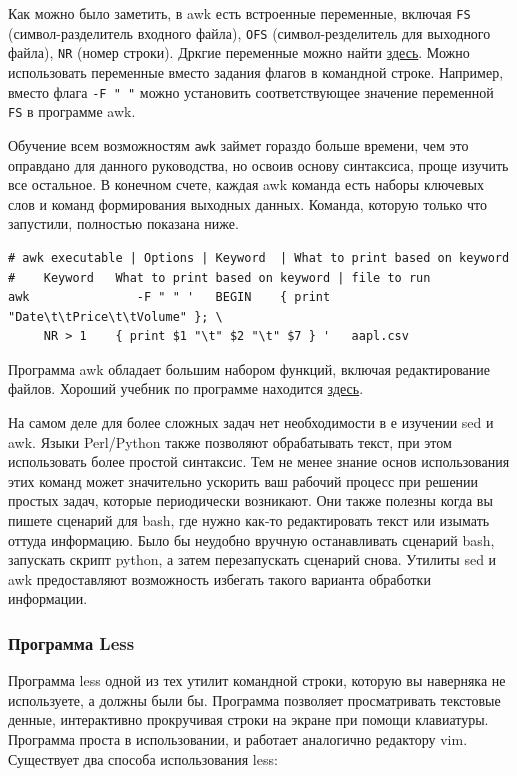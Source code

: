 \documentclass[12pt]{article}
\begin{document}
Как можно было заметить, в awk есть встроенные переменные, включая
\texttt{FS} (символ-разделитель входного файла), \texttt{OFS}
(символ-резделитель для выходного файла), \texttt{NR} (номер строки).
Дркгие переменные можно найти
\href{https://www.tutorialspoint.com/awk/awk_built_in_variables.htm}{здесь}.
Можно использовать переменные вместо задания флагов в командной строке.
Например, вместо флага \texttt{-F\ "\ "} можно установить
соответствующее значение переменной \texttt{FS} в программе awk.

Обучение всем возможностям \texttt{awk} займет гораздо больше времени,
чем это оправдано для данного руководства, но освоив основу синтаксиса,
проще изучить все остальное. В конечном счете, каждая awk команда есть
наборы ключевых слов и команд формирования выходных данных. Команда,
которую только что запустили, полностью показана ниже.

\begin{verbatim}
# awk executable | Options | Keyword  | What to print based on keyword
#    Keyword   What to print based on keyword | file to run
awk               -F " " '   BEGIN    { print "Date\t\tPrice\t\tVolume" }; \
     NR > 1    { print $1 "\t" $2 "\t" $7 } '   aapl.csv
\end{verbatim}

Программа awk обладает большим набором функций, включая редактирование
файлов. Хороший учебник по программе находится
\href{https://likegeeks.com/awk-command/}{здесь}.

На самом деле для более сложных задач нет необходимости в е изучении sed
и awk. Языки Perl/Python также позволяют обрабатывать текст, при этом
использовать более простой синтаксис. Тем не менее знание основ
использования этих команд может значительно ускорить ваш рабочий процесс
при решении простых задач, которые периодически возникают. Они также
полезны когда вы пишете сценарий для bash, где нужно как-то
редактировать текст или изымать оттуда информацию. Было бы неудобно
вручную останавливать сценарий bash, запускать скрипт python, а затем
перезапускать сценарий снова. Утилиты sed и awk предоставляют
возможность избегать такого варианта обработки информации.

\hypertarget{Less}{%
\subsubsection{\texorpdfstring{\protect\hyperlink{Less}{}Программа
Less}{Программа Less}}\label{Less}}

Программа less одной из тех утилит командной строки, которую вы
наверняка не используете, а должны были бы. Программа позволяет
просматривать текстовые денные, интерактивно прокручивая строки на
экране при помощи клавиатуры. Программа проста в использовании, и
работает аналогично редактору vim. Существует два способа использования
less:
\end{document}
